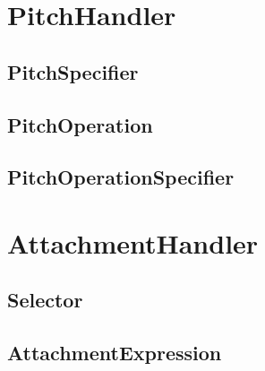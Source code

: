 \section{PitchHandler}

    \subsection{PitchSpecifier}

    \subsection{PitchOperation}

    \subsection{PitchOperationSpecifier}

\section{AttachmentHandler}

    \subsection{Selector}

    \subsection{AttachmentExpression}